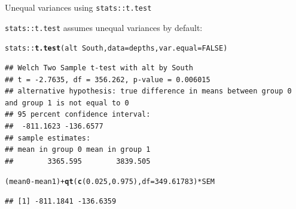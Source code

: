 \documentclass[10pt,handout]{beamer}\usepackage[]{graphicx}\usepackage[]{color}
\makeatletter
\newcommand{\hlnum}[1]{\textcolor[rgb]{0.686,0.059,0.569}{#1}}%
\newcommand{\hlopt}[1]{\textcolor[rgb]{0,0,0}{#1}}%
\newcommand{\hlstd}[1]{\textcolor[rgb]{0.345,0.345,0.345}{#1}}%
\newcommand{\hlkwc}[1]{\textcolor[rgb]{0.333,0.667,0.333}{#1}}%
\newcommand{\hlkwd}[1]{\textcolor[rgb]{0.737,0.353,0.396}{\textbf{#1}}}%
\newenvironment{kframe}{%
 \def\at@end@of@kframe{}%
 \ifinner\ifhmode%
  \def\at@end@of@kframe{\end{minipage}}%
  \begin{minipage}{\columnwidth}%
 \fi\fi%
 \def\FrameCommand##1{\hskip\@totalleftmargin \hskip-\fboxsep
 \colorbox{shadecolor}{##1}\hskip-\fboxsep
     \hskip-\linewidth \hskip-\@totalleftmargin \hskip\columnwidth}%
 \MakeFramed {\advance\hsize-\width
   \@totalleftmargin\z@ \linewidth\hsize
   \@setminipage}}%
 {\par\unskip\endMakeFramed%
 \at@end@of@kframe}
\newenvironment{knitrout}{}{} %
\makeatother
\begin{document}
\begin{frame}[fragile]{Unequal variances using \texttt{stats::t.test}}
	
	\texttt{stats::t.test} assumes unequal variances by default:
	
	
\begin{knitrout}\scriptsize
{}\color{fgcolor}\begin{kframe}
\begin{alltt}
\hlstd{stats}\hlopt{::}\hlkwd{t.test}\hlstd{(alt} \hlopt{~} \hlstd{South,} \hlkwc{data} \hlstd{= depths,} \hlkwc{var.equal} \hlstd{=} \hlnum{FALSE}\hlstd{)}
\end{alltt}
\begin{verbatim}
## Welch Two Sample t-test with alt by South 
## t = -2.7635, df = 356.262, p-value = 0.006015
## alternative hypothesis: true difference in means between group 0 and group 1 is not equal to 0 
## 95 percent confidence interval:
##  -811.1623 -136.6577 
## sample estimates:
## mean in group 0 mean in group 1 
##        3365.595        3839.505
\end{verbatim}
\begin{alltt}
\hlstd{(mean0} \hlopt{-} \hlstd{mean1)} \hlopt{+} \hlkwd{qt}\hlstd{(}\hlkwd{c}\hlstd{(}\hlnum{0.025}\hlstd{,} \hlnum{0.975}\hlstd{),} \hlkwc{df} \hlstd{=} \hlnum{349.61783}\hlstd{)} \hlopt{*} \hlstd{SEM}
\end{alltt}
\begin{verbatim}
## [1] -811.1841 -136.6359
\end{verbatim}
\end{kframe}
\end{knitrout}
	
	
\end{frame}
\end{document}
